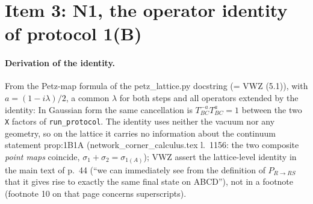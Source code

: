 \documentclass[11pt]{article}
\begin{document}
\section{Item 3: N1, the operator identity of protocol 1(B)}\label{sec:i3}
\paragraph{Derivation of the identity.} From the Petz-map formula of the petz\_lattice.py docstring (= VWZ (5.1)),
with $a=(1-i\lambda)/2$, a common $\lambda$ for both steps and all operators extended by the identity:
\noindent In Gaussian form the same cancellation is $T_{BC}^{-a}T_{BC}^{a}=1$ between the two \texttt{X} factors
of \texttt{run\_protocol}. The identity uses neither the vacuum nor any geometry, so on the lattice it carries no
information about the continuum statement prop:1B1A (network\_corner\_calculus.tex l.~1156: the two composite
\emph{point maps} coincide, $\sigma_1+\sigma_2=\sigma_{1(A)}$); VWZ assert the lattice-level identity in the main
text of p.~44 (``we can immediately see from the definition of $P_{R\to RS}$ that it gives rise to exactly the same
final state on ABCD''), not in a footnote (footnote 10 on that page concerns superscripts).
\end{document}
